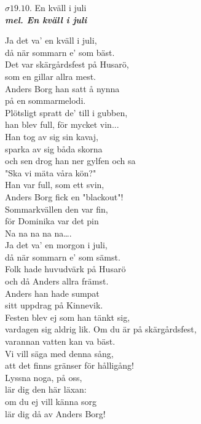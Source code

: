\documentclass[a6paper,10pt]{article}
\newcommand{\mel}[1]{\small\textbf{\textit{mel. #1 \\}}}
\begin{document}
\begin{center}
\Large $\sigma19.10$. En kväll i juli \\
\mel{En kväll i juli}
\end{center}\small Ja det va' en kväll i juli,\\
då när sommarn e' som bäst.\\
Det var skärgårdsfest på Husarö,\\
som en gillar allra mest.\\
Anders Borg han satt å nynna \\
på en sommarmelodi. \\
Plötsligt spratt de' till i gubben, \\
han blev full, för mycket vin...
\vspace{5pt}\\
Han tog av sig sin kavaj,\\ 
sparka av sig båda skorna \\ 
och sen drog han ner gylfen och sa\\
"Ska vi mäta våra kön?"\\
Han var full, som ett svin,\\ 
Anders Borg fick en "blackout"!\\
Sommarkvällen den var fin, \\
för Dominika var det pin
\vspace{5pt}\\
Na na na na na…. 
\vspace{5pt}\\
Ja det va' en morgon i juli,\\
då när sommarn e' som sämst.\\
Folk hade huvudvärk på Husarö\\
och då Anders allra främst.\\
Anders han hade sumpat \\
sitt uppdrag på Kinnevik.\\
Festen blev ej som han tänkt sig,\\
vardagen sig aldrig lik.
\newpage
\setlength{\oddsidemargin}{-0.37in}
\noindent
Om du är på skärgårdsfest,\\
varannan vatten kan va bäst.\\
Vi vill säga med denna sång, \\
att det finns gränser för hålligång!\\ 
Lyssna noga, på oss,\\
lär dig den här läxan: \\
om du ej vill känna sorg\\
lär dig då av Anders Borg!\\
\end{document}
